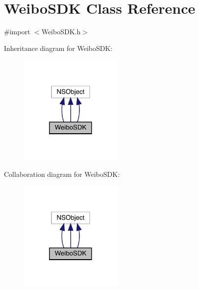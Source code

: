 \hypertarget{interface_weibo_s_d_k}{}\section{Weibo\+S\+DK Class Reference}
\label{interface_weibo_s_d_k}


{\ttfamily \#import $<$Weibo\+S\+D\+K.\+h$>$}



Inheritance diagram for Weibo\+S\+DK\+:\nopagebreak
\begin{figure}[H]
\begin{center}
\leavevmode
\includegraphics[width=145pt]{interface_weibo_s_d_k__inherit__graph}
\end{center}
\end{figure}


Collaboration diagram for Weibo\+S\+DK\+:\nopagebreak
\begin{figure}[H]
\begin{center}
\leavevmode
\includegraphics[width=145pt]{interface_weibo_s_d_k__coll__graph}
\end{center}
\end{figure}
